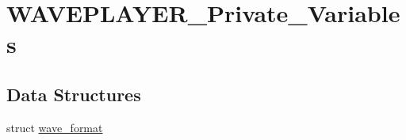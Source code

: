 \hypertarget{group___w_a_v_e_p_l_a_y_e_r___private___variables}{\section{W\-A\-V\-E\-P\-L\-A\-Y\-E\-R\-\_\-\-Private\-\_\-\-Variables}
\label{group___w_a_v_e_p_l_a_y_e_r___private___variables}
}
\subsection*{Data Structures}
\begin{DoxyCompactItemize}
\item 
struct \hyperlink{structwave__format}{wave\-\_\-format}
\end{DoxyCompactItemize}
